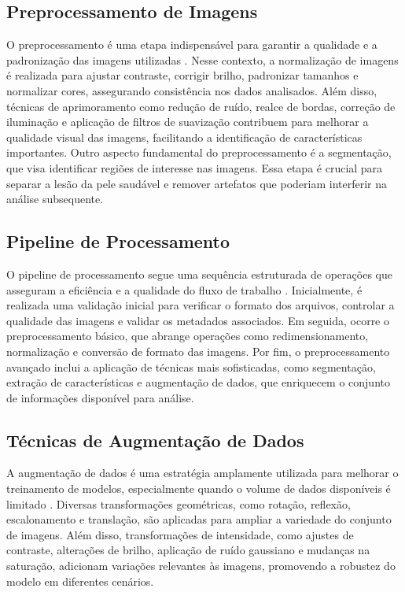 \subsection{Preprocessamento de Imagens}
O preprocessamento é uma etapa indispensável para garantir a qualidade e a padronização das imagens utilizadas \cite{smith2023image}. Nesse contexto, a normalização de imagens é realizada para ajustar contraste, corrigir brilho, padronizar tamanhos e normalizar cores, assegurando consistência nos dados analisados. Além disso, técnicas de aprimoramento como redução de ruído, realce de bordas, correção de iluminação e aplicação de filtros de suavização contribuem para melhorar a qualidade visual das imagens, facilitando a identificação de características importantes.
Outro aspecto fundamental do preprocessamento é a segmentação, que visa identificar regiões de interesse nas imagens. Essa etapa é crucial para separar a lesão da pele saudável e remover artefatos que poderiam interferir na análise subsequente.
\subsection{Pipeline de Processamento}
O pipeline de processamento segue uma sequência estruturada de operações que asseguram a eficiência e a qualidade do fluxo de trabalho \cite{wang2023automated}. Inicialmente, é realizada uma validação inicial para verificar o formato dos arquivos, controlar a qualidade das imagens e validar os metadados associados. Em seguida, ocorre o preprocessamento básico, que abrange operações como redimensionamento, normalização e conversão de formato das imagens. Por fim, o preprocessamento avançado inclui a aplicação de técnicas mais sofisticadas, como segmentação, extração de características e augmentação de dados, que enriquecem o conjunto de informações disponível para análise.
\subsection{Técnicas de Augmentação de Dados}
A augmentação de dados é uma estratégia amplamente utilizada para melhorar o treinamento de modelos, especialmente quando o volume de dados disponíveis é limitado \cite{zhang2023augmentation}. Diversas transformações geométricas, como rotação, reflexão, escalonamento e translação, são aplicadas para ampliar a variedade do conjunto de imagens. Além disso, transformações de intensidade, como ajustes de contraste, alterações de brilho, aplicação de ruído gaussiano e mudanças na saturação, adicionam variações relevantes às imagens, promovendo a robustez do modelo em diferentes cenários.
